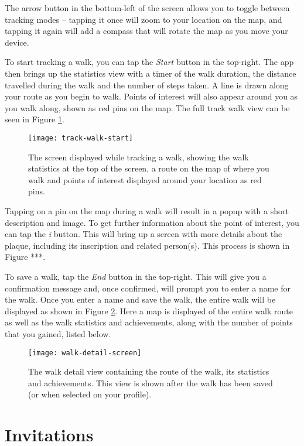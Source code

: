 The arrow button in the bottom-left of the screen allows you to toggle between tracking modes -- tapping it once will zoom to your location on the map, and tapping it again will add a compass that will rotate the map as you move your device.

To start tracking a walk, you can tap the \textit{Start} button in the top-right. The app then brings up the statistics view with a timer of the walk duration, the distance travelled during the walk and the number of steps taken. A line is drawn along your route as you begin to walk. Points of interest will also appear around you as you walk along, shown as red pins on the map. The full track walk view can be seen in Figure \ref{fig:track-walk-start}.

\begin{figure}[hbt]
  \centering
  \texttt{[image: track-walk-start]}
  \caption{The screen displayed while tracking a walk, showing the walk statistics at the top of the screen, a route on the map of where you walk and points of interest displayed around your location as red pins.}
  \label{fig:track-walk-start}
\end{figure}


Tapping on a pin on the map during a walk will result in a popup with a short description and image. To get further information about the point of interest, you can tap the \textit{i} button. This will bring up a screen with more details about the plaque, including its inscription and related person(s). This process is shown in Figure ***.

To save a walk, tap the \textit{End} button in the top-right. This will give you a confirmation message and, once confirmed, will prompt you to enter a name for the walk. Once you enter a name and save the walk, the entire walk will be displayed as shown in Figure \ref{fig:walk-detail-screen}. Here a map is displayed of the entire walk route as well as the walk statistics and achievements, along with the number of points that you gained, listed below.

\begin{figure}[hbt]
  \centering
  \texttt{[image: walk-detail-screen]}
  \caption{The walk detail view containing the route of the walk, its statistics and achievements. This view is shown after the walk has been saved (or when selected on your profile).}
  \label{fig:walk-detail-screen}
\end{figure}


\section{Invitations}

